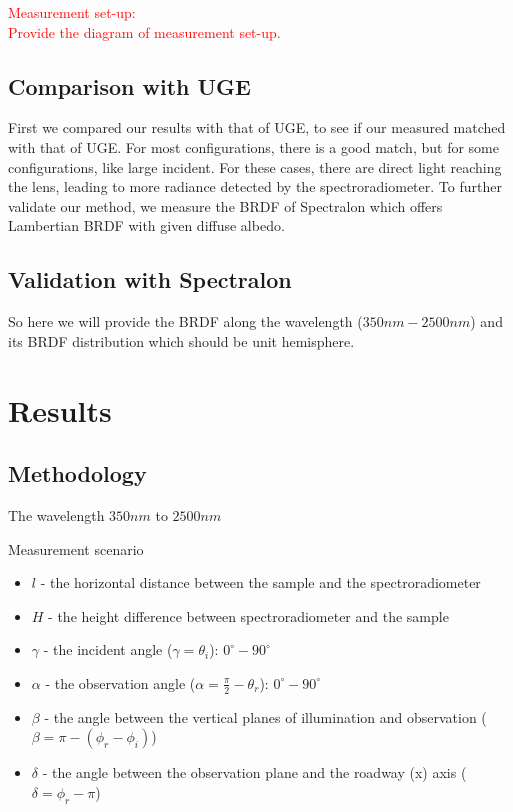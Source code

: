 \textcolor{red}{Measurement set-up:\\
    Provide the diagram of measurement set-up.
}


\subsection{Comparison with UGE}
First we compared our results with that of UGE, to see if our measured matched with that of UGE.
For most configurations, there is a good match, but for some configurations, like large incident.
For these cases, there are direct light reaching the lens, leading to more radiance detected by the spectroradiometer.
To further validate our method, we measure the BRDF of Spectralon which offers Lambertian BRDF with given diffuse albedo.

\subsection{Validation with Spectralon}

So here we will provide the BRDF along the wavelength ($350nm - 2500nm$) and its BRDF distribution which should be unit hemisphere.


\section{Results}

\subsection{Methodology}

The wavelength $350nm$ to $2500nm$

Measurement scenario
\begin{itemize}
    \item $l$ - the horizontal distance between the sample and the spectroradiometer
    \item $H$ - the height difference between spectroradiometer and the sample
    \item $\gamma$ - the incident angle ($\gamma = \theta_i$): $0^{\circ} - 90^{\circ}$

    \item $\alpha$ - the observation angle ($\alpha = \frac{\pi}{2} - \theta_r$): $0^{\circ} - 90^{\circ}$

    \item $\beta$ - the angle between the vertical planes of illumination and observation ($\beta = \pi - (\phi_r - \phi_i)$)
    \item $\delta$ - the angle between the observation plane and the roadway (x) axis ($\delta = \phi_r - \pi$)
\end{itemize}



